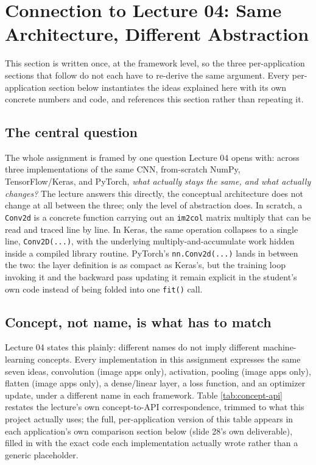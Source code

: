 \documentclass[11pt]{article}
\newcommand{\code}[1]{\texttt{#1}}
\begin{document}
\section{Connection to Lecture 04: Same Architecture, Different Abstraction}
\label{sec:lecture}

This section is written once, at the framework level, so the three per-application
sections that follow do not each have to re-derive the same argument. Every
per-application section below instantiates the ideas explained here with its
own concrete numbers and code, and references this section rather than
repeating it.

\subsection{The central question}

The whole assignment is framed by one question Lecture 04 opens with: across
three implementations of the same CNN, from-scratch NumPy, TensorFlow/Keras,
and PyTorch, \textit{what actually stays the same, and what actually
changes?} The lecture answers this directly, the conceptual architecture does
not change at all between the three; only the level of abstraction does. In
scratch, a \code{Conv2d} is a concrete function carrying out an
\code{im2col} matrix multiply that can be read and traced line by line. In
Keras, the same operation collapses to a single line, \code{Conv2D(...)},
with the underlying multiply-and-accumulate work hidden inside a compiled
library routine. PyTorch's \code{nn.Conv2d(...)} lands in between the two:
the layer definition is as compact as Keras's, but the training loop invoking
it and the backward pass updating it remain explicit in the student's own
code instead of being folded into one \code{fit()} call.

\subsection{Concept, not name, is what has to match}

Lecture 04 states this plainly: different names do not imply different
machine-learning concepts. Every implementation in this assignment expresses
the same seven ideas, convolution (image apps only), activation, pooling
(image apps only), flatten (image apps only), a dense/linear layer, a loss
function, and an optimizer update, under a different name in each framework.
Table \ref{tab:concept-api} restates the lecture's own concept-to-API
correspondence, trimmed to what this project actually uses; the full,
per-application version of this table appears in each application's own
comparison section below (slide 28's own deliverable), filled in with the
exact code each implementation actually wrote rather than a generic
placeholder.
\end{document}
